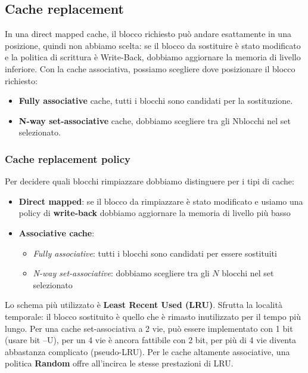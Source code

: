 \subsection{Cache replacement}
In una direct mapped cache, il blocco richiesto può andare esattamente in una posizione, quindi non abbiamo scelta: 
se il blocco da sostituire è stato modificato e la politica di scrittura è Write-Back, dobbiamo aggiornare la memoria di livello inferiore. 
Con la cache associativa, possiamo scegliere dove posizionare il blocco richiesto: 
\begin{itemize}
	\item \textbf{Fully associative} cache, tutti i blocchi sono candidati per la sostituzione.
	\item \textbf{N-way set-associative} cache, dobbiamo scegliere tra gli Nblocchi nel set selezionato.
\end{itemize}


\subsubsection{Cache replacement policy}
Per decidere quali blocchi rimpiazzare dobbiamo distinguere per i tipi di cache:
\begin{itemize}
	\item \textbf{Direct mapped}: se il blocco da rimpiazzare è stato modificato e usiamo una policy di \textbf{write-back} dobbiamo aggiornare la memoria di livello più basso
	\item \textbf{Associative cache}:
	\begin{itemize}
		\item  \emph{Fully associative}: tutti i blocchi sono candidati per essere sostituiti
		\item \emph{N-way set-associative}: dobbiamo scegliere tra gli $N$ blocchi nel set selezionato
	\end{itemize}
\end{itemize}
Lo schema più utilizzato è \textbf{Least Recent Used (LRU)}. Sfrutta la località temporale: il blocco sostituito è quello che è rimasto inutilizzato per il tempo più lungo. 
Per una cache set-associativa a 2 vie, può essere implementato con 1 bit (usare bit --U), per un 4 vie è ancora fattibile con 2 bit, per più di 4 vie diventa abbastanza complicato (pseudo-LRU).
Per le cache altamente associative, una politica \textbf{Random} offre all'incirca le stesse prestazioni di LRU.

